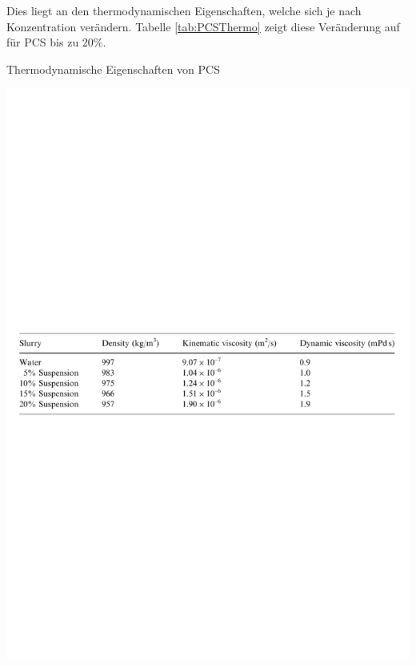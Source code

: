 \documentclass[11pt,a4paper]{scrartcl}
\begin{document}
Dies liegt an den thermodynamischen Eigenschaften, welche sich je nach
Konzentration verändern. Tabelle \ref{tab:PCSThermo} zeigt diese Veränderung auf
für PCS bis zu 20\%.

\begin{table}[h!]
\begin{center}
\caption{Thermodynamische Eigenschaften von PCS \cite{Gschwander}}
\includegraphics[scale=0.6]{images/HenningTable.pdf}
\label{tab:PCSThermo}
\end{center}
\end{table}
\end{document}
